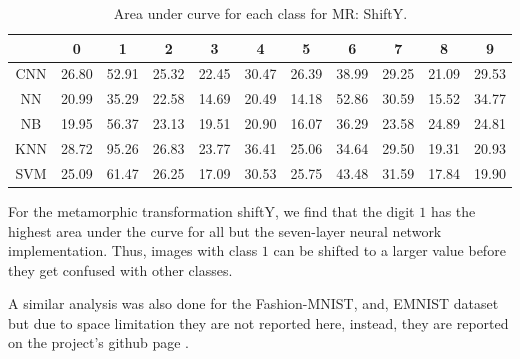     \begin{table}[H]
    \centering
    \begin{tabular}{|c|c|c|c|c|c|c|c|c|c|c|}
    \hline
    & 0 & 1 & 2 & 3 & 4 & 5 & 6 & 7 & 8 & 9 \\
    \hline
    CNN & 26.80 & \cellcolor{green!25}52.91 & 25.32 & 22.45 & 30.47 & 26.39 & 38.99 & 29.25 & \cellcolor{red!25}21.09 & 29.53 \\ 
    \hline
    NN &  20.99 & 35.29 & 22.58 & 14.69 & 20.49 & \cellcolor{red!25}14.18 & \cellcolor{green!25}52.86 & 30.59 & 15.52 & 34.77 \\
    \hline
    NB & 19.95 & \cellcolor{green!25}56.37 & 23.13 & 19.51 & 20.90 & \cellcolor{red!25}16.07 & 36.29 & 23.58 & 24.89 & 24.81 \\
    \hline
    KNN & 28.72 & \cellcolor{green!25}95.26 & 26.83 & 23.77 & 36.41 & 25.06 & 34.64 & 29.50 & \cellcolor{red!25}19.31 & 20.93 \\
    \hline
    SVM & 25.09 & \cellcolor{green!25}61.47 & 26.25 & \cellcolor{red!25}17.09 & 30.53 & 25.75 & 43.48 & 31.59 & 17.84 & 19.90  \\
    \hline
    \end{tabular}
    \caption{Area under curve for each class for MR: ShiftY.}
    \label{tbl:test-file-formatShiftY}
    \end{table}
    For the metamorphic transformation shiftY, we find that the digit $1$ has the highest area under the curve for all but the seven-layer neural network implementation. Thus, images with class $1$ can be shifted to a larger value before they get confused with other classes.
    
A similar analysis was also done for the Fashion-MNIST, and, EMNIST dataset but due to space limitation they are not reported here, instead, they are reported on the project's github page \cite{abhishek2020}.

